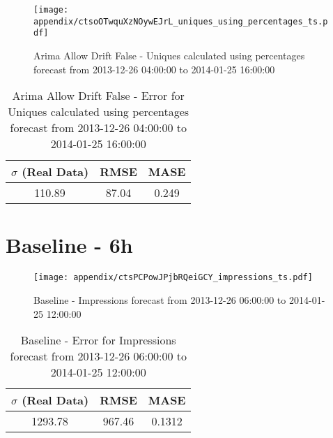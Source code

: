 \begin{figure}[H] \begin{center} \leavevmode
\texttt{[image: appendix/ctsoOTwquXzNOywEJrL\_uniques\_using\_percentages\_ts.pdf]} \caption{
Arima Allow Drift False - Uniques calculated using percentages forecast from 2013-12-26 04:00:00 to 2014-01-25 16:00:00} \label{fig:appendix/ctsoOTwquXzNOywEJrL_uniques_using_percentages_ts.pdf} \end{center}
\end{figure}

\begin{table}[H]
\centering
\footnotesize
\begin{tabular}{ccc}
$\sigma$ (Real Data) & RMSE & MASE   \\ \hline
110.89 & 87.04 & 0.249 \\
\end{tabular}

\vspace{0.5cm}

\caption{
Arima Allow Drift False - Error for Uniques calculated using percentages forecast from 2013-12-26 04:00:00 to 2014-01-25 16:00:00}
\end{table}

\section{Baseline - 6h}
\begin{figure}[H] \begin{center} \leavevmode
\texttt{[image: appendix/ctsPCPowJPjbRQeiGCY\_impressions\_ts.pdf]} \caption{
Baseline - Impressions forecast from 2013-12-26 06:00:00 to 2014-01-25 12:00:00} \label{fig:appendix/ctsPCPowJPjbRQeiGCY_impressions_ts.pdf} \end{center}
\end{figure}

\begin{table}[H]
\centering
\footnotesize
\begin{tabular}{ccc}
$\sigma$ (Real Data) & RMSE & MASE   \\ \hline
1293.78 & 967.46 & 0.1312 \\
\end{tabular}

\vspace{0.5cm}

\caption{
Baseline - Error for Impressions forecast from 2013-12-26 06:00:00 to 2014-01-25 12:00:00}
\end{table}

